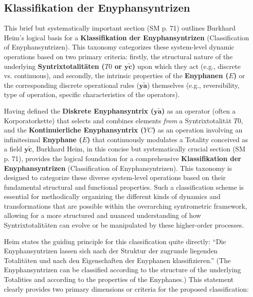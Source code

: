 \documentclass[12pt]{article}
\newcommand{\q}[1]{\enquote{#1}}
\newcommand{\syntrixtotalitaet}{T0}
\newcommand{\diskreteEnyphansyntrix}{\bm{y\widetilde{a}}}
\newcommand{\kontinuierlicheEnyphansyntrix}{YC}
\newcommand{\enyphane}{E}
\begin{document}
\subsection{Klassifikation der Enyphansyntrizen}
\label{sec:enyphansyntrix_classification}

This brief but systematically important section (SM p. 71) outlines Burkhard Heim's logical basis for a \textbf{Klassifikation der Enyphansyntrizen} (Classification of Enyphansyntrizen). This taxonomy categorizes these system-level dynamic operations based on two primary criteria: firstly, the structural nature of the underlying \textbf{Syntrixtotalitäten (\(\syntrixtotalitaet\) or \(\mathbf{y\widetilde{c}}\))} upon which they act (e.g., discrete vs. continuous), and secondly, the intrinsic properties of the \textbf{Enyphanen (\(\enyphane\))} or the corresponding discrete operational rules (\(\diskreteEnyphansyntrix\)) themselves (e.g., reversibility, type of operation, specific characteristics of the operators).

Having defined the \textbf{Diskrete Enyphansyntrix (\( \diskreteEnyphansyntrix \))} as an operator (often a Korporatorkette) that selects and combines elements \textit{from} a Syntrixtotalität \( \syntrixtotalitaet \), and the \textbf{Kontinuierliche Enyphansyntrix (\( \kontinuierlicheEnyphansyntrix \))} as an operation involving an infinitesimal \textbf{Enyphane (\( \enyphane \))} that continuously modulates a Totality conceived as a field \( \mathbf{y\widetilde{c}} \), Burkhard Heim, in this concise but systematically crucial section (SM p. 71), provides the logical foundation for a comprehensive \textbf{Klassifikation der Enyphansyntrizen} (Classification of Enyphansyntrizen). This taxonomy is designed to categorize these diverse system-level operations based on their fundamental structural and functional properties. Such a classification scheme is essential for methodically organizing the different kinds of dynamics and transformations that are possible within the overarching syntrometric framework, allowing for a more structured and nuanced understanding of how Syntrixtotalitäten can evolve or be manipulated by these higher-order processes.

Heim states the guiding principle for this classification quite directly: \q{Die Enyphansyntrizen lassen sich nach der Struktur der zugrunde liegenden Totalitäten und nach den Eigenschaften der Enyphanen klassifizieren.} (The Enyphansyntrizen can be classified according to the structure of the underlying Totalities and according to the properties of the Enyphanes.) This statement clearly provides two primary dimensions or criteria for the proposed classification:
\end{document}

